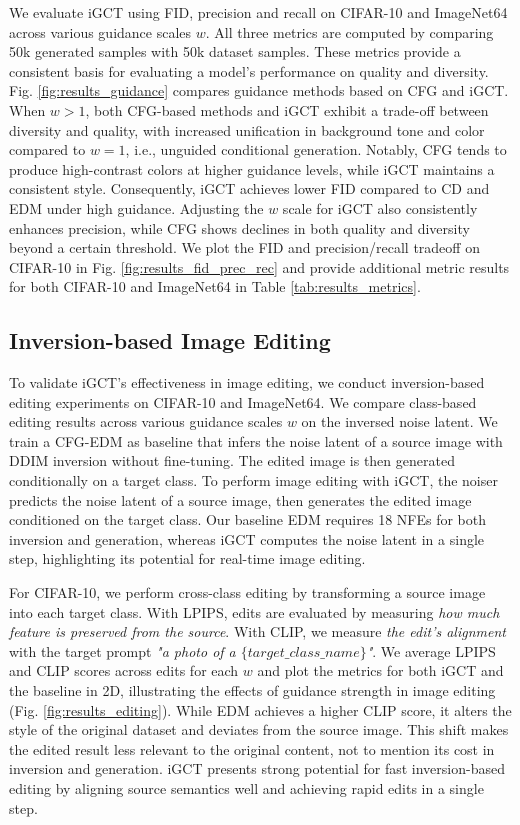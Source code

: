 We evaluate iGCT using FID, precision and recall \cite{kynkäänniemi2019improvedprecisionrecallmetric} on CIFAR-10 and ImageNet64 across various guidance scales \(w\). All three metrics are computed by comparing 50k generated samples with 50k dataset samples. These metrics provide a consistent basis for evaluating a model's performance on quality and diversity. Fig. \ref{fig:results_guidance} compares guidance methods based on CFG and iGCT. When \(w>1\), both CFG-based methods and iGCT exhibit a trade-off between diversity and quality, with increased unification in background tone and color compared to \(w=1\), i.e., unguided conditional generation. Notably, CFG tends to produce high-contrast colors at higher guidance levels, while iGCT maintains a consistent style. Consequently, iGCT achieves lower FID compared to CD and EDM under high guidance. Adjusting the \(w\) scale for iGCT also consistently enhances precision, while CFG shows declines in both quality and diversity beyond a certain threshold. We plot the FID and precision/recall tradeoff on CIFAR-10 in Fig. \ref{fig:results_fid_prec_rec} and provide additional metric results for both CIFAR-10 and ImageNet64 in Table \ref{tab:results_metrics}.

\vspace{-0.15cm}
\subsection{Inversion-based Image Editing}
\vspace{-0.15cm}
\label{sec:image-editing}
To validate iGCT’s effectiveness in image editing, we conduct inversion-based editing experiments on CIFAR-10 and ImageNet64. We compare class-based editing results across various guidance scales \(w\) on the inversed noise latent. We train a CFG-EDM as baseline that infers the noise latent of a source image with DDIM inversion \cite{mokady2023null} without fine-tuning. The edited image is then generated conditionally on a target class. To perform image editing with iGCT, the noiser predicts the noise latent of a source image, then generates the edited image conditioned on the target class. Our baseline EDM requires 18 NFEs for both inversion and generation, whereas iGCT computes the noise latent in a single step, highlighting its potential for real-time image editing.

For CIFAR-10, we perform cross-class editing by transforming a source image into each target class. With LPIPS, edits are evaluated by measuring \textit{how much feature is preserved from the source}. With CLIP, we measure \textit{the edit's alignment} with the target prompt \textit{"a photo of a \(\{target\_class\_name\}\)"}. We average LPIPS and CLIP scores across edits for each \(w\) and plot the metrics for both iGCT and the baseline in 2D, illustrating the effects of guidance strength in image editing (Fig. \ref{fig:results_editing}). While EDM achieves a higher CLIP score, it alters the style of the original dataset and deviates from the source image. This shift makes the edited result less relevant to the original content, not to mention its cost in inversion and generation. iGCT presents strong potential for fast inversion-based editing by aligning source semantics well and achieving rapid edits in a single step.


